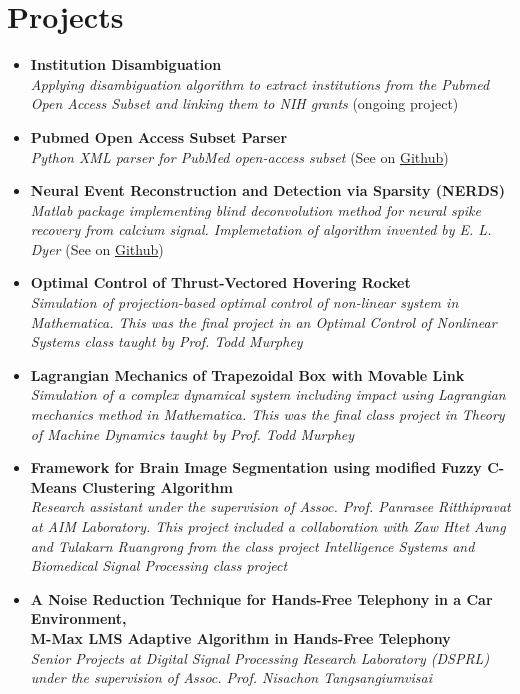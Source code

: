 \section{\sc Projects}
\begin{itemize}[leftmargin=0cm, label={}]

\item {\bf Institution Disambiguation}\\
{\em Applying disambiguation algorithm to extract institutions from the Pubmed Open Access Subset and linking them to NIH grants} (ongoing project)

\item {\bf Pubmed Open Access Subset Parser}\\
{\em Python XML parser for PubMed open-access subset} (See on \href{https://github.com/titipata/pubmed_parser}{Github})

\item {\bf Neural Event Reconstruction and Detection via Sparsity (NERDS)}\\
{\em Matlab package implementing blind deconvolution method for neural spike recovery from calcium signal. Implemetation of algorithm invented by E. L. Dyer} (See on \href{https://github.com/KordingLab/nerds}{Github})

\item {\bf Optimal Control of Thrust-Vectored Hovering Rocket}\\
{\em Simulation of projection-based optimal control of non-linear system in Mathematica. This was the final project in an  Optimal Control of Nonlinear Systems class taught by Prof. Todd Murphey}

\item {\bf Lagrangian Mechanics of Trapezoidal Box with Movable Link}\\
{\em Simulation of a complex dynamical system including impact using Lagrangian mechanics method in Mathematica. This was the final class project in Theory of Machine Dynamics taught by Prof. Todd Murphey }

\item {\bf Framework for Brain Image Segmentation using modified Fuzzy C-Means Clustering Algorithm}\\
{\em Research assistant under the supervision of Assoc. Prof. Panrasee Ritthipravat at AIM Laboratory. This project included a collaboration with Zaw Htet Aung and Tulakarn Ruangrong from the class project Intelligence Systems and Biomedical Signal Processing class project}

\item {\bf A Noise Reduction Technique for Hands-Free Telephony in a Car Environment, } \\
{\bf M-Max LMS Adaptive Algorithm in Hands-Free Telephony}\\
{\em Senior Projects at Digital Signal Processing Research Laboratory (DSPRL) under the supervision of Assoc. Prof. Nisachon Tangsangiumvisai}

\end{itemize}
